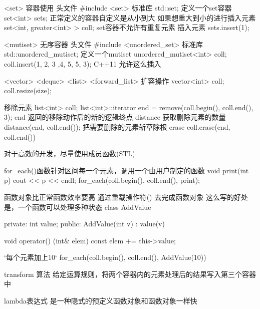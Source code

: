 
<set> 容器使用
头文件
#include <set>
标准库
std::set;
定义一个set容器
set<int> sets;
正常定义的容器自定义是从小到大
如果想重大到小的进行插入元素
set<int, greater<int> > coll;
set容器不允许有重复元素
	插入元素
	sets.insert(1);
	
<mutiset> 无序容器
头文件
#include <unordered_set>
标准库
std::unordered_mutiset;
定义一个mutiset
	unordered_mutiset<int> coll;
	coll.insert({1, 2, 3 ,4, 5, 5, 3}); C++11 允许这么插入
	
	
<vector> <deque> <list> <forward_list>  扩容操作
	vector<int> coll;
	coll.resize(size);

移除元素
	list<int> coll;
	list<int>::iterator end = remove(coll.begin(), coll.end(), 3);
	end 返回的移除动作后的新的逻辑终点
	distance 获取删除元素的数量
	distance(end, coll.end());
	把需要删除的元素斩草除根 erase
	coll.erase(end, coll.end())
	
对于高效的开发，尽量使用成员函数(STL)

	for_each()函数针对区间每一个元素，调用一个由用户制定的函数
	void print(int p) {
		cout << p << endl;
	}
	for_each(coll.begin(), coll.end(), print);
	
函数对象比正常函数效率要高
	通过重载操作符() 去完成函数对象
	这么写的好处是，一个函数可以处理多种状态
	class AddValue {
	private: 
		int value;
	public:
		AddValue(int v) : value(v) {}
		
		void operator() (int& elem) const {
			elem += this->value;
		}
	
	}
	`每个元素加上10`
	for_each(coll.begin(), coll.end(), AddValue(10))
	
	
transform 算法
给定运算规则，将两个容器内的元素处理后的结果写入第三个容器中	

lambda表达式 是一种隐式的预定义函数对象和函数对象一样快


	

